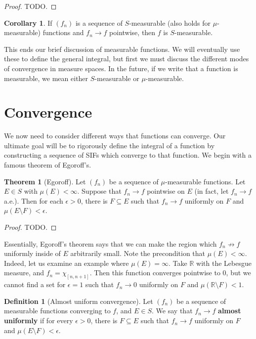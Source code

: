 \documentclass[11pt, oneside]{amsart}   	%
\theoremstyle{definition}
\newtheorem{definition}{Definition}[section]
\newtheorem{theorem}{Theorem}[section]
\newtheorem{corollary}{Corollary}[theorem]
\begin{document}
	\begin{proof}
		TODO.
	\end{proof}
	
	\begin{corollary}
		If $(f_n)$ is a sequence of $S$-measurable (also holds for $\mu$-measurable) functions and $f_n\rightarrow f$ 
		pointwise, then $f$ is $S$-measurable.
	\end{corollary}
	
	This ends our brief discussion of measurable functions. We will eventually use these to define the general integral, 
	but first we must discuss the different modes of convergence in measure spaces. In the future, if we write that a 
	function is measurable, we mean either $S$-measurable or $\mu$-measurable.
	
	\section{Convergence}
	
	We now need to consider different ways that functions can converge. Our ultimate goal will be to rigorously define the 
	integral of a function by constructing a sequence of SIFs which converge to that function. We begin with a famous 
	theorem of Egoroff's. 
	
	\begin{theorem}[Egoroff]
		Let $(f_n)$ be a sequence of $\mu$-measurable functions. Let $E\in S$ with $\mu(E) < \infty$. Suppose that $f_n
		\rightarrow f$ pointwise on $E$ (in fact, let $f_n\rightarrow f$ a.e.). Then for each $\epsilon > 0$, there is $F
		\subseteq E$ such that $f_n\rightarrow f$ uniformly on $F$ and $\mu(E\setminus F) < \epsilon$.
	\end{theorem}
	
	\begin{proof}
		TODO.
	\end{proof}

	Essentially, Egoroff's theorem says that we can make the region which $f_n\not\rightarrow f$ uniformly inside of $E$ 
	arbitrarily small. Note the precondition that $\mu(E) < \infty$. Indeed, let us examine an example where $\mu(E) = \infty$. 
	Take $\mathbb R$ with the Lebesgue measure, and $f_n = \chi_{[n, n + 1]}$. Then this function converges pointwise to 
	$0$, but we cannot find a set for $\epsilon = 1$ such that $f_n\rightarrow 0$ uniformly on $F$ and $\mu(\mathbb R
	\setminus F) < 1$. 
	
	\begin{definition}[Almost uniform convergence]
		Let $(f_n)$ be a sequence of measurable functions converging to $f$, and $E\in S$. We say that $f_n\rightarrow f$ 
		\textbf{almost uniformly} if for every $\epsilon > 0$, there is $F\subseteq E$ such that $f_n\rightarrow f$ uniformly 
		on $F$ and $\mu(E\setminus F) < \epsilon$. 
	\end{definition}
	
\end{document}
